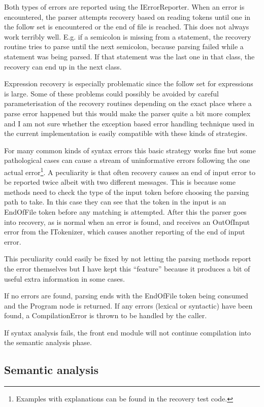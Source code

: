 \documentclass[a4paper,11pt]{article}
\begin{document}
Both types of errors are reported using the IErrorReporter. When an error is encountered, the parser attempts recovery based on reading tokens until one in the follow set is encountered or the end of file is reached. This does not always work terribly well. E.g. if a semicolon is missing from a statement, the recovery routine tries to parse until the next semicolon, because parsing failed while a statement was being parsed. If that statement was the last one in that class, the recovery can end up in the next class.

Expression recovery is especially problematic since the follow set for expressions is large. Some of these problems could possibly be avoided by careful parameterisation of the recovery routines depending on the exact place where a parse error happened but this would make the parser quite a bit more complex and I am not sure whether the exception based error handling technique used in the current implementation is easily compatible with these kinds of strategies.

For many common kinds of syntax errors this basic strategy works fine but some pathological cases can cause a stream of uninformative errors following the one actual error\footnote{Examples with explanations can be found in the recovery test code.}. A peculiarity is that often recovery causes an end of input error to be reported twice albeit with two different messages. This is because some methods need to check the type of the input token before choosing the parsing path to take. In this case they can see that the token in the input is an EndOfFile token before any matching is attempted. After this the parser goes into recovery, as is normal when an error is found, and receives an OutOfInput error from the ITokenizer, which causes another reporting of the end of input error.

This peculiarity could easily be fixed by not letting the parsing methods report the error themselves but I have kept this ``feature'' because it produces a bit of useful extra information in some cases.

If no errors are found, parsing ends with the EndOfFile token being consumed and the Program node is returned. If any errors (lexical or syntactic) have been found, a CompilationError is thrown to be handled by the caller.

If syntax analysis fails, the front end module will not continue compilation into the semantic analysis phase.

\subsection{Semantic analysis}
\end{document}

